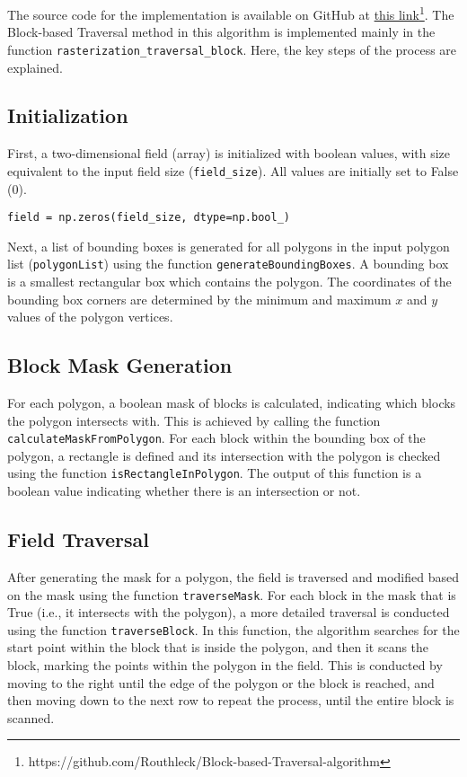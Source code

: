 \documentclass[
	a4paper, %
	10pt, %
	unnumberedsections, %
	twoside, %
]{LTJournalArticle}
\begin{document}
The source code for the implementation is available on GitHub at \href{https://github.com/Routhleck/Block-based-Traversal-algorithm}{this link}\footnote{https://github.com/Routhleck/Block-based-Traversal-algorithm}.
The Block-based Traversal method in this algorithm is implemented mainly in the function \texttt{rasterization\_traversal\_block}. Here, the key steps of the process are explained.

\subsection{Initialization}

First, a two-dimensional field (array) is initialized with boolean values, with size equivalent to the input field size (\texttt{field\_size}). All values are initially set to False (0).

\begin{verbatim}
field = np.zeros(field_size, dtype=np.bool_)
\end{verbatim}

Next, a list of bounding boxes is generated for all polygons in the input polygon list (\texttt{polygonList}) using the function \texttt{generateBoundingBoxes}. A bounding box is a smallest rectangular box which contains the polygon. The coordinates of the bounding box corners are determined by the minimum and maximum $x$ and $y$ values of the polygon vertices.

\subsection{Block Mask Generation}

For each polygon, a boolean mask of blocks is calculated, indicating which blocks the polygon intersects with. This is achieved by calling the function \texttt{calculateMaskFromPolygon}. For each block within the bounding box of the polygon, a rectangle is defined and its intersection with the polygon is checked using the function \texttt{isRectangleInPolygon}. The output of this function is a boolean value indicating whether there is an intersection or not.

\subsection{Field Traversal}

After generating the mask for a polygon, the field is traversed and modified based on the mask using the function \texttt{traverseMask}. For each block in the mask that is True (i.e., it intersects with the polygon), a more detailed traversal is conducted using the function \texttt{traverseBlock}. In this function, the algorithm searches for the start point within the block that is inside the polygon, and then it scans the block, marking the points within the polygon in the field. This is conducted by moving to the right until the edge of the polygon or the block is reached, and then moving down to the next row to repeat the process, until the entire block is scanned.
\end{document}
